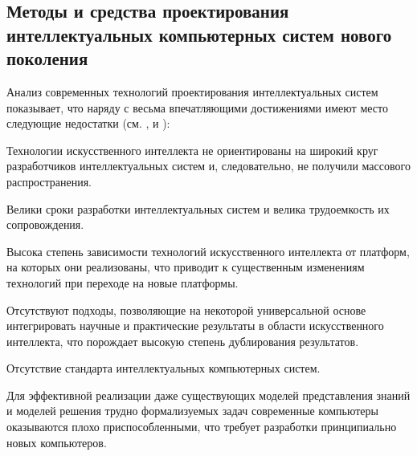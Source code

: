 
\begin{partbacktext}
\part{Методы и средства проектирования интеллектуальных компьютерных систем нового поколения}
\noindent
Анализ современных технологий проектирования интеллектуальных систем показывает, что
наряду с весьма впечатляющими достижениями имеют место следующие недостатки (см. ,  и ):
\begin{textitemize}
	\item{Технологии искусственного интеллекта не ориентированы на широкий круг разработчиков
	интеллектуальных систем и, следовательно, не получили массового распространения.}
	\item{Велики сроки разработки интеллектуальных систем и велика трудоемкость их
		сопровождения.}
	\item{Высока степень зависимости технологий искусственного интеллекта от платформ, на которых
		они реализованы, что приводит к существенным изменениям технологий при переходе на
		новые платформы.}
	\item{Отсутствуют подходы, позволяющие на некоторой универсальной основе интегрировать
		научные и практические результаты в области искусственного интеллекта, что порождает
		высокую степень дублирования результатов.}
	\item{Отсутствие стандарта интеллектуальных компьютерных систем.}
	\item{Для эффективной реализации даже существующих моделей представления знаний и моделей
		решения трудно формализуемых задач современные компьютеры оказываются плохо
		приспособленными, что требует разработки принципиально новых компьютеров.}
\end{textitemize}


\end{partbacktext}
